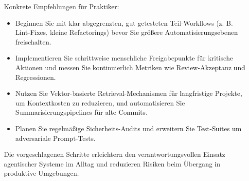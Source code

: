Konkrete Empfehlungen für Praktiker:

\begin{itemize}
  \item Beginnen Sie mit klar abgegrenzten, gut getesteten Teil-Workflows (z. B. Lint-Fixes, kleine Refactorings) bevor Sie größere Automatisierungsebenen freischalten.
  \item Implementieren Sie schrittweise menschliche Freigabepunkte für kritische Aktionen und messen Sie kontinuierlich Metriken wie Review-Akzeptanz und Regressionen.
  \item Nutzen Sie Vektor-basierte Retrieval-Mechanismen für langfristige Projekte, um Kontextkosten zu reduzieren, und automatisieren Sie Summarisierungspipelines für alte Commits.
  \item Planen Sie regelmäßige Sicherheits-Audits und erweitern Sie Test-Suites um adversariale Prompt-Tests.
\end{itemize}

Die vorgeschlagenen Schritte erleichtern den verantwortungsvollen Einsatz agentischer Systeme im Alltag und reduzieren Risiken beim Übergang in produktive Umgebungen.
